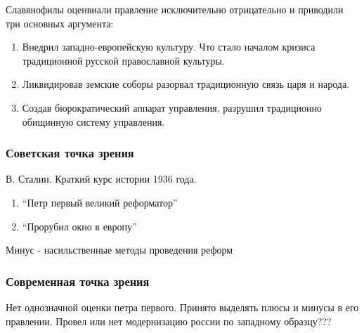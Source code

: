 \documentclass[a4paper]{article}
\begin{document}
Славянофилы оценвиали правление исключительно отрицательно и приводили три основных аргумента:
\begin{enumerate}
    \item Внедрил западно-европейскую культуру. Что стало началом кризиса традиционной русской православной культуры.
    \item Ликвидировав земские соборы разорвал традиционную связь царя и народа.
    \item Создав бюрократический аппарат управления, разрушил традиционно обищинную систему управления.
\end{enumerate}

\subsubsection{Советская точка зрения}
В. Сталин.
Краткий курс истории 1936 года.
\begin{enumerate}
    \item ``Петр первый великий реформатор''
    \item ``Прорубил окно в европу''
\end{enumerate}
Минус - насильственные методы проведения реформ

\subsubsection{Современная точка зрения}
Нет однозначной оценки петра первого. Принято выделять плюсы и минусы в его правлении.
Провел или нет модернизацию россии по западному образцу???
\end{document}
